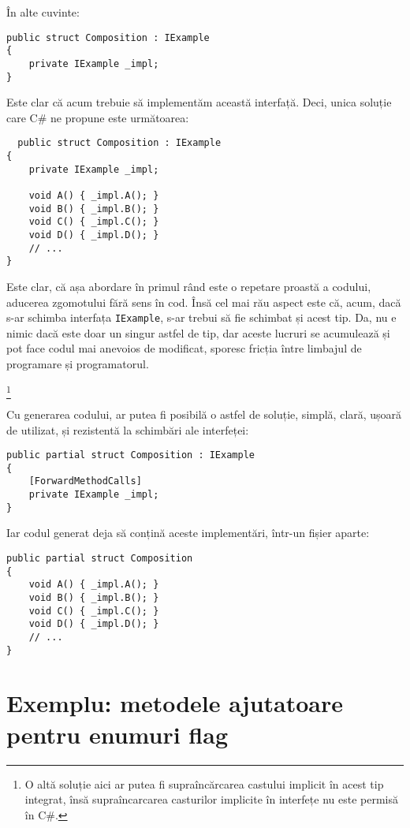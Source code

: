 \documentclass{report}
\begin{document}
În alte cuvinte:

\begin{lstlisting}
public struct Composition : IExample
{
    private IExample _impl;
}
\end{lstlisting}

Este clar că acum trebuie să implementăm această interfață.
Deci, unica soluție care C\# ne propune este următoarea:

\begin{lstlisting}
  public struct Composition : IExample
{
    private IExample _impl;

    void A() { _impl.A(); }
    void B() { _impl.B(); }
    void C() { _impl.C(); }
    void D() { _impl.D(); }
    // ...
}
\end{lstlisting}

Este clar, că așa abordare în primul rând este o repetare proastă a codului, aducerea zgomotului fără sens în cod.
Însă cel mai rău aspect este că, acum, dacă s-ar schimba interfața \texttt{IExample}, s-ar trebui să fie schimbat și acest tip. 
Da, nu e nimic dacă este doar un singur astfel de tip, dar aceste lucruri se acumulează și pot face codul mai anevoios de modificat, sporesc fricția între limbajul de programare și programatorul.

\footnote{
  O altă soluție aici ar putea fi supraîncărcarea castului implicit în acest tip integrat,
  însă supraîncarcarea casturilor implicite în interfețe nu este permisă în C\#.
}

Cu generarea codului, ar putea fi posibilă o astfel de soluție, simplă, clară, ușoară de utilizat, și rezistentă la schimbări ale interfeței:

\begin{lstlisting}
public partial struct Composition : IExample
{
    [ForwardMethodCalls]
    private IExample _impl;
}
\end{lstlisting}

Iar codul generat deja să conțină aceste implementări, într-un fișier aparte:

\begin{lstlisting}
public partial struct Composition
{
    void A() { _impl.A(); }
    void B() { _impl.B(); }
    void C() { _impl.C(); }
    void D() { _impl.D(); }
    // ...
}
\end{lstlisting}


\section{Exemplu: metodele ajutatoare pentru enumuri flag}
\end{document}
